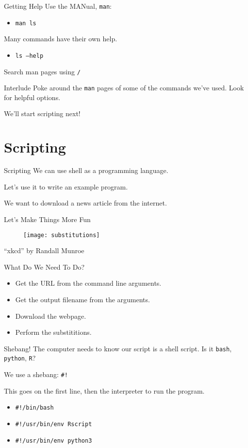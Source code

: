 \documentclass[pdf,usenames,dvipsnames,14pt]{beamer}%
\begin{document}
\begin{frame}{Getting Help}
	Use the MANual, \texttt{man}:
	\begin{itemize}
		\item \texttt{man ls}
	\end{itemize}
	Many commands have their own help.
	\begin{itemize}
		\item \texttt{ls --help}
	\end{itemize}
	Search man pages using \texttt{/}
\end{frame}

\begin{frame}{Interlude}
	Poke around the \texttt{man} pages of some of the commands we've used. Look for helpful options.
	
	We'll start scripting next!
\end{frame}

\section{Scripting}

\begin{frame}{Scripting}
	We can use shell as a programming language.
	
	Let's use it to write an example program.
	
	We want to download a news article from the internet.
\end{frame}

\begin{frame}{Let's Make Things More Fun}
	\begin{figure}
		\texttt{[image: substitutions]}
	\end{figure}
	``xkcd'' by Randall Munroe
\end{frame}

\begin{frame}{What Do We Need To Do?}
	\begin{itemize}
		\item Get the URL from the command line arguments.
		\item Get the output filename from the arguments.
		\item Download the webpage.
		\item Perform the substititions.
	\end{itemize}
\end{frame}

\begin{frame}{Shebang!}
	The computer needs to know our script is a shell script.
	Is it \texttt{bash}, \texttt{python}, \texttt{R}?
	
	We use a shebang: \texttt{\#!}
	
	This goes on the first line, then the interpreter to run the program.
	\begin{itemize}
		\item \texttt{\#!/bin/bash}
		\item \texttt{\#!/usr/bin/env Rscript}
		\item \texttt{\#!/usr/bin/env python3}
	\end{itemize}
\end{frame}
\end{document}
